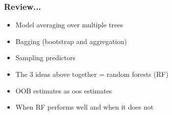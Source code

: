 \documentclass[handout]{beamer}
\begin{document}
\begin{frame}\frametitle{Review...}

\begin{itemize}
\item Model averaging over multiple trees
\item Bagging (bootstrap and aggregation)
\item Sampling predictors
\item The 3 ideas above together = random forests (RF)
\item OOB estimates as oos estimates
\item When RF performs well and when it does not
\end{itemize}
	
\end{frame}
\end{document}
